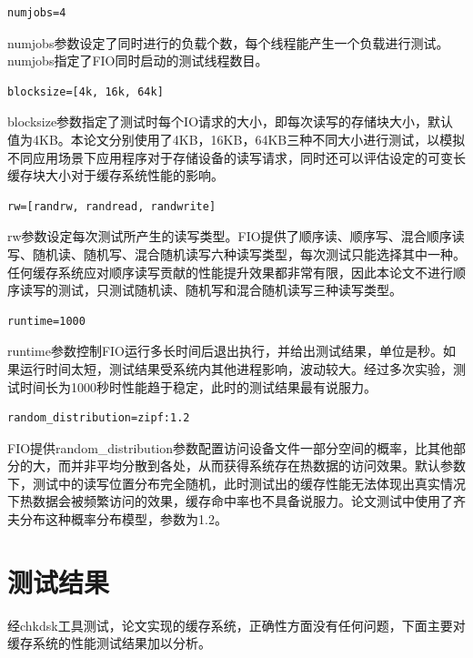 \begin{lstlisting}
numjobs=4
\end{lstlisting}

numjobs参数设定了同时进行的负载个数，每个线程能产生一个负载进行测试。numjobs指定了FIO同时启动的测试线程数目。

\begin{lstlisting}
blocksize=[4k, 16k, 64k]
\end{lstlisting}

blocksize参数指定了测试时每个IO请求的大小，即每次读写的存储块大小，默认值为4KB。本论文分别使用了4KB，16KB，64KB三种不同大小进行测试，以模拟不同应用场景下应用程序对于存储设备的读写请求，同时还可以评估设定的可变长缓存块大小对于缓存系统性能的影响。

\begin{lstlisting}
rw=[randrw, randread, randwrite]
\end{lstlisting}

rw参数设定每次测试所产生的读写类型。FIO提供了顺序读、顺序写、混合顺序读写、随机读、随机写、混合随机读写六种读写类型，每次测试只能选择其中一种。任何缓存系统应对顺序读写贡献的性能提升效果都非常有限，因此本论文不进行顺序读写的测试，只测试随机读、随机写和混合随机读写三种读写类型。

\begin{lstlisting}
runtime=1000
\end{lstlisting}

runtime参数控制FIO运行多长时间后退出执行，并给出测试结果，单位是秒。如果运行时间太短，测试结果受系统内其他进程影响，波动较大。经过多次实验，测试时间长为1000秒时性能趋于稳定，此时的测试结果最有说服力。

\begin{lstlisting}
random_distribution=zipf:1.2
\end{lstlisting}

FIO提供random\_distribution参数配置访问设备文件一部分空间的概率，比其他部分的大，而并非平均分散到各处，从而获得系统存在热数据的访问效果。默认参数下，测试中的读写位置分布完全随机，此时测试出的缓存性能无法体现出真实情况下热数据会被频繁访问的效果，缓存命中率也不具备说服力。论文测试中使用了齐夫分布这种概率分布模型，参数为1.2。

\section{测试结果}
\label{sec:exp_results}

经chkdsk工具测试，论文实现的缓存系统，正确性方面没有任何问题，下面主要对缓存系统的性能测试结果加以分析。

